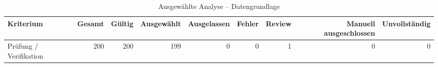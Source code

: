 \begin{table}[htbp]
\centering
\caption{Ausgewählte Analyse -- Datengrundlage}
\begin{tabular}{lrrrrrrrr}
\toprule
Kriterium & Gesamt & Gültig & Ausgewählt & Ausgelassen & Fehler & Review & Manuell ausgeschlossen & Unvollständig \\
\midrule
Prüfung / Verifikation & 200 & 200 & 199 & 0 & 0 & 1 & 0 & 0 \\
\bottomrule
\end{tabular}
\end{table}
